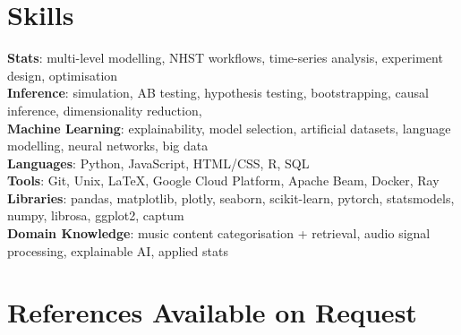 \documentclass[letterpaper,11pt]{article}
\begin{document}
\section{Skills}
 \begin{itemize}[leftmargin=0.15in, label={}]
    \small{\item{
     \textbf{Stats}{: multi-level modelling, NHST workflows, time-series analysis, experiment design, optimisation} \\
     \textbf{Inference}{: simulation, AB testing, hypothesis testing, bootstrapping, causal inference, dimensionality reduction,} \\
     \textbf{Machine Learning}{: explainability, model selection, artificial datasets, language modelling, neural networks, big data} \\
     \textbf{Languages}{: Python, JavaScript, HTML/CSS, R, SQL} \\
     \textbf{Tools}{: Git, Unix, \LaTeX, Google Cloud Platform, Apache Beam, Docker, Ray} \\
     \textbf{Libraries}{: pandas, matplotlib, plotly, seaborn, scikit-learn, pytorch, statsmodels, numpy, librosa, ggplot2, captum} \\
     \textbf{Domain Knowledge}{: music content categorisation + retrieval, audio signal processing, explainable AI, applied stats}
    }}
 \end{itemize}

\section{References Available on Request}

\end{document}
